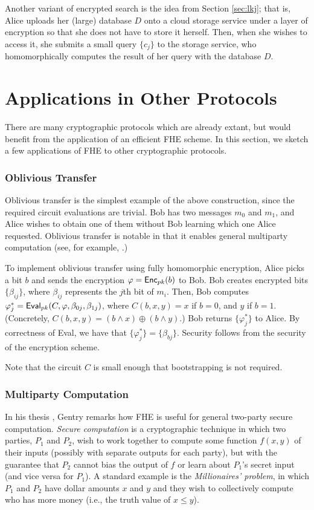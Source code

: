 Another variant of encrypted search is the idea from Section \ref{sec:lkj}; that is, Alice uploads her (large) database $D$ onto a cloud storage service under a layer of encryption so that she does not have to store it herself. Then, when she wishes to access it, she submits a small query $\{c_j\}$ to the storage service, who homomorphically computes the result of her query with the database $D$.

\section{Applications in Other Protocols}
There are many cryptographic protocols which are already extant, but would benefit from the application of an efficient FHE scheme. In this section, we sketch a few applications of FHE to other cryptographic protocols.

\subsubsection{Oblivious Transfer}
	Oblivious transfer is the simplest example of the above construction, since the required circuit evaluations are trivial. Bob has two messages $m_0$ and $m_1$, and Alice wishes to obtain one of them without Bob learning which one Alice requested. Oblivious transfer is notable in that it enables general multiparty computation (see, for example, \cite{Goldreich87}.)

	To implement oblivious transfer using fully homomorphic encryption, Alice picks a bit $b$ and sends the encryption $\varphi = {\sf Enc}_{pk}(b)$ to Bob. Bob creates encrypted bits $\{\beta_{ij}\}$, where $\beta_{ij}$ represents the $j$th bit of $m_i$. Then, Bob computes $\varphi^*_j = {\sf Eval}_{pk}(C, \varphi, \beta_{0j}, \beta_{1j})$, where $C(b, x, y) = x$ if $b = 0$, and $y$ if $b = 1$. (Concretely, $C(b,x,y) = (b \wedge x) \oplus (b \wedge y).$)
    Bob returns $\{\varphi^*_j\}$ to Alice. By correctness of Eval, we have that $\{\varphi^*_j\} = \{\beta_{bj}\}$. Security follows from the security of the encryption scheme.

	Note that the circuit $C$ is small enough that bootstrapping is not required.






\subsubsection{Multiparty Computation}
    In his thesis \cite{gentry2009fully}, Gentry remarks how FHE is useful for general two-party secure computation. \emph{Secure computation} is a cryptographic technique in which two parties, $P_1$ and $P_2$, wish to work together to compute some function $f(x,y)$ of their inputs (possibly with separate outputs for each party), but with the guarantee that $P_2$ cannot bias the output of $f$ or learn about $P_1$'s secret input (and vice versa for $P_1$). A standard example is the \emph{Millionaires' problem}, in which $P_1$ and $P_2$ have dollar amounts $x$ and $y$ and they wish to collectively compute who has more money (i.e., the truth value of $x \leq y$).

